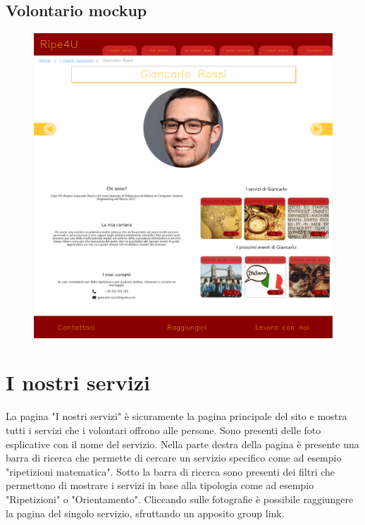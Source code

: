         \subsection{Volontario mockup}
        \begin{figure}[H]
            \centering
            \includegraphics[scale=0.18]{resources/images/volontario-mockup.png}
        \end{figure}

    \newpage
    \section{I nostri servizi}
    La pagina "I nostri servizi" è sicuramente la pagina principale del sito e
    mostra tutti i servizi che i volontari offrono alle persone. Sono presenti
    delle foto esplicative con il nome del servizio. Nella parte destra della
    pagina è presente una barra di ricerca che permette di cercare un servizio
    specifico come ad esempio "ripetizioni matematica". Sotto la barra di
    ricerca sono presenti dei filtri che permettono di mostrare i servizi in
    base alla tipologia come ad esempio "Ripetizioni" o "Orientamento".
    Cliccando sulle fotografie è possibile raggiungere la pagina del singolo
    servizio, sfruttando un apposito group link.
